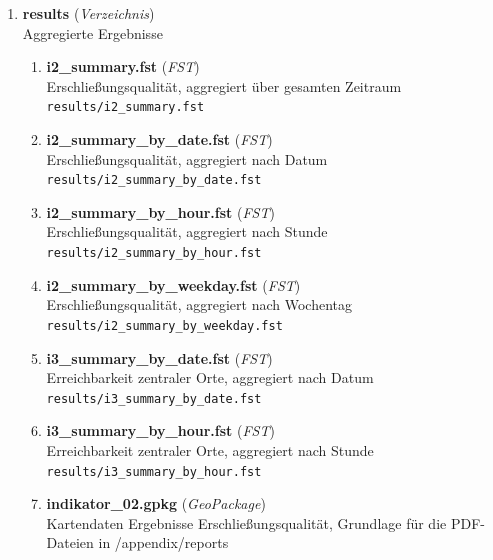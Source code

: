 \begin{enumerate}[label=\arabic*, leftmargin=*, itemsep=0.5em, topsep=0.3em]
\begin{enumerate}[label=\arabic{enumi}.\arabic*, leftmargin=*, itemsep=0.5em, topsep=0.3em]
\begin{enumerate}[label=\arabic{enumi}.\arabic{enumii}.\arabic*, leftmargin=*, itemsep=0.5em, topsep=0.3em]
Darstelllung der Erreichbarkeit zentraler Orte je Gemeinde mit Variabilitätsmaßen. 4 Seiten je Gemeinde.\\
\texttt{\small appendix/reports/Indikator\_03\_Atlas.pdf}
\end{enumerate}
\end{enumerate}
\item \textbf{results} \textnormal{(\textit{Verzeichnis})}\\
Aggregierte Ergebnisse
\begin{enumerate}[label=\arabic{enumi}.\arabic*, leftmargin=*, itemsep=0.5em, topsep=0.3em]
\item \textbf{i2\_summary.fst} \textnormal{(\textit{FST})}\\
Erschließungsqualität, aggregiert über gesamten Zeitraum\\
\texttt{\small results/i2\_summary.fst}
\item \textbf{i2\_summary\_by\_date.fst} \textnormal{(\textit{FST})}\\
Erschließungsqualität, aggregiert nach Datum\\
\texttt{\small results/i2\_summary\_by\_date.fst}
\item \textbf{i2\_summary\_by\_hour.fst} \textnormal{(\textit{FST})}\\
Erschließungsqualität, aggregiert nach Stunde\\
\texttt{\small results/i2\_summary\_by\_hour.fst}
\item \textbf{i2\_summary\_by\_weekday.fst} \textnormal{(\textit{FST})}\\
Erschließungsqualität, aggregiert nach Wochentag\\
\texttt{\small results/i2\_summary\_by\_weekday.fst}
\item \textbf{i3\_summary\_by\_date.fst} \textnormal{(\textit{FST})}\\
Erreichbarkeit zentraler Orte, aggregiert nach Datum\\
\texttt{\small results/i3\_summary\_by\_date.fst}
\item \textbf{i3\_summary\_by\_hour.fst} \textnormal{(\textit{FST})}\\
Erreichbarkeit zentraler Orte, aggregiert nach Stunde\\
\texttt{\small results/i3\_summary\_by\_hour.fst}
\item \textbf{indikator\_02.gpkg} \textnormal{(\textit{GeoPackage})}\\
Kartendaten Ergebnisse Erschließungsqualität, Grundlage für die PDF-Dateien in /appendix/reports\\

\end{enumerate}
\end{enumerate}

